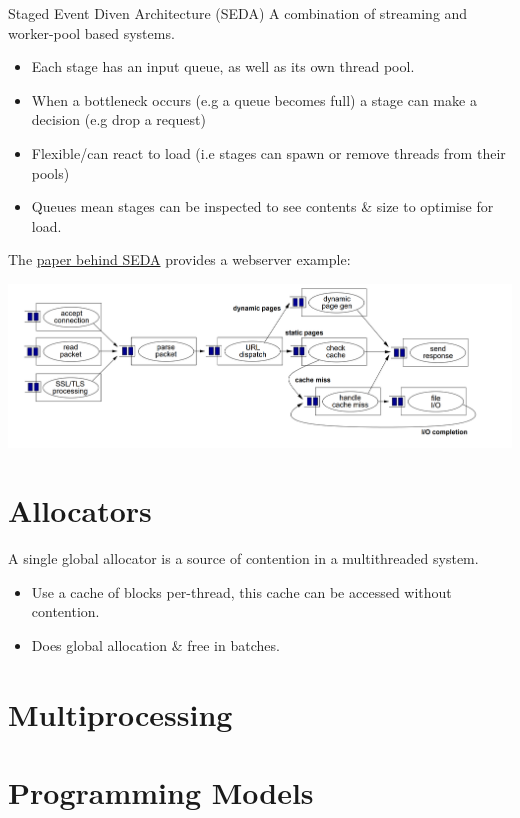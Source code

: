 \begin{definitionbox}{Staged Event Diven Architecture (SEDA)}
    A combination of streaming and worker-pool based systems.
    \begin{itemize}
        \item Each stage has an input queue, as well as its own thread pool.
        \item When a bottleneck occurs (e.g a queue becomes full) a stage can make a decision (e.g drop a request)
        \item Flexible/can react to load (i.e stages can spawn or remove threads from their pools)
        \item Queues mean stages can be inspected to see contents \& size to optimise for load.
    \end{itemize}
    The \href{https://web.archive.org/web/20120704004128/http://www.eecs.harvard.edu/~mdw/papers/mdw-phdthesis.pdf}{paper behind SEDA} provides a webserver example:
    \begin{center}
        \includegraphics[width=.9\textwidth]{parallelism/images/SEDA.png}
    \end{center}
\end{definitionbox}

\section{Allocators}
A single global allocator is a source of contention in a multithreaded system.
\begin{itemize}
    \item Use a cache of blocks per-thread, this cache can be accessed without contention.
    \item Does global allocation \& free in batches. 
\end{itemize}

\section{Multiprocessing}
\unfinished

\section{Programming Models}
\unfinished



